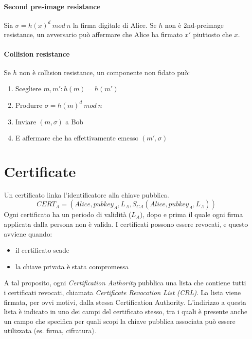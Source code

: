 \documentclass[a4paper,12pt]{article}
\begin{document}
\paragraph{Second pre-image resistance}
Sia $\sigma = h(x)^d\ mod\ n$ la firma digitale di Alice. Se $h$ non è 2nd-preimage resistance, un avversario può affermare che Alice ha firmato $x'$ piuttosto che $x$.

\paragraph{Collision resistance}
Se $h$ non è collision resistance, un componente non fidato può:
\begin{enumerate}
	\item Scegliere $m, m' : h(m) = h(m')$
	\item Produrre $\sigma = h(m)^d\ mod\ n$
	\item Inviare $(m, \sigma)$ a Bob
	\item E affermare che ha effettivamente emesso $(m', \sigma)$
\end{enumerate}

\newpage

\section{Certificate}
Un certificato linka l'identificatore alla chiave pubblica.
$$ CERT_A = (Alice, pubkey_A, L_A, S_{CA}(Alice, pubkey_A, L_A))$$
Ogni certificato ha un periodo di validità ($L_A$), dopo e prima il quale ogni firma applicata dalla persona non è valida. 
I certificati possono essere revocati, e questo avviene quando:
\begin{itemize}
	\item il certificato scade
	\item la chiave privata è stata compromessa
\end{itemize}
A tal proposito, ogni \textit{Certification Authority} pubblica una lista che contiene tutti i certificati revocati, chiamata \textit{Certificate Revocation List (CRL)}.
La lista viene firmata, per ovvi motivi, dalla stessa Certification Authority. L'indirizzo a questa lista è indicato in uno dei campi del certificato stesso, tra i quali è presente anche un campo che specifica per quali scopi la chiave pubblica associata può essere utilizzata (es. firma, cifratura).
\end{document}
